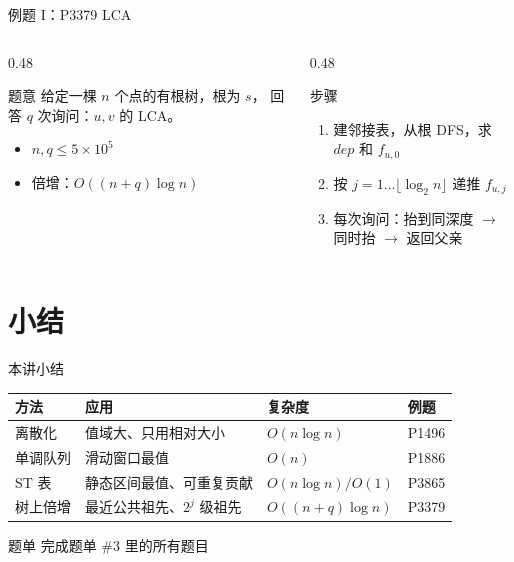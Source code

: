 \documentclass[aspectratio=169]{beamer}
\begin{document}
\begin{frame}{例题 I：P3379 LCA}
    \begin{columns}[T]
        \begin{column}{0.48\textwidth}
            \small
            \begin{block}{题意}
                \footnotesize
                给定一棵 $n$ 个点的有根树，根为 $s$，
                回答 $q$ 次询问：$u,v$ 的 LCA。
            \end{block}
            \begin{itemize}
                \item $n,q\le 5\times10^5$
                \item 倍增：$O((n+q)\log n)$
            \end{itemize}
        \end{column}
        \begin{column}{0.48\textwidth}
            \begin{block}{步骤}
                \footnotesize
                \begin{enumerate}
                    \item 建邻接表，从根 DFS，求 $dep$ 和 $f_{u,0}$
                    \item 按 $j=1\dots \lfloor\log_2 n\rfloor$ 递推 $f_{u,j}$
                    \item 每次询问：抬到同深度 $\to$ 同时抬 $\to$ 返回父亲
                \end{enumerate}
            \end{block}
            \vspace{0.4em}
        \end{column}
    \end{columns}
\end{frame}

\section{小结}

\begin{frame}{本讲小结}
    \centering
    \footnotesize
    \begin{tabular}{llll}
        \toprule
        方法 & 应用 & 复杂度 & 例题 \\
        \midrule
        离散化 & 值域大、只用相对大小 & $O(n\log n)$ & P1496 \\
        单调队列 & 滑动窗口最值 & $O(n)$ & P1886 \\
        ST 表 & 静态区间最值、可重复贡献 & $O(n\log n)/O(1)$ & P3865 \\
        树上倍增 & 最近公共祖先、$2^j$ 级祖先 & $O((n+q)\log n)$ & P3379 \\
        \bottomrule
    \end{tabular}
    \vspace{1.1em}
    \begin{block}{题单}
        \footnotesize
        完成题单 $\#3$ 里的所有题目
    \end{block}
\end{frame}
\end{document}
